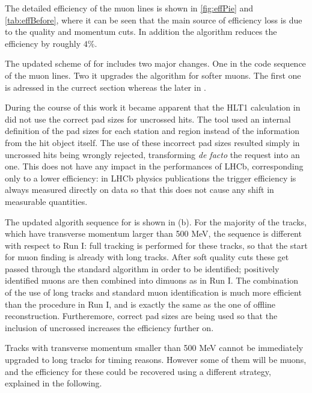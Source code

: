 The detailed efficiency of the \runone \hltone muon lines is shown in \autoref{fig:effPie} and \autoref{tab:effBefore},
where it can be seen that the main source of efficiency loss is due to the quality and momentum cuts.
In addition the \mvm algorithm reduces the efficiency by roughly $4\%$.

The updated scheme of \hltone for \runtwo includes two major changes.
One in the code sequence of the \hltone muon lines. Two it upgrades the \mvm algorithm for softer muons. The first one is adressed
in the currect section whereas the later in .

During the course of this work it became apparent that the HLT1  calculation in \runone
did not use the correct pad sizes for uncrossed hits.
The tool used an internal definition of the pad sizes for each station and
region instead of the information from the hit object itself.
The use of these incorrect pad sizes resulted simply in uncrossed hits being wrongly
rejected, transforming \emph{de facto} the  request into an  one.
This does not have any impact in the performances of LHCb, corresponding only to a lower efficiency:
in LHCb physics publications the trigger efficiency is always measured directly on data so that this
does not cause any shift in measurable quantities.

The updated \hltone algorith sequence for \runtwo is shown in (b).
For the majority of the tracks, which have transverse momentum larger than 500 MeV, the sequence is different with respect to
Run I:
full tracking is performed for these tracks, so that the start for muon finding is already with long tracks.
After soft quality cuts these get passed through the standard  algorithm in order to be identified;
positively identified muons are then combined into dimuons as in Run I.
The combination of the use of long tracks and standard muon identification is much more efficient than the
procedure in Run I, and is exactly the same as the one of offline reconstruction.
Furtheremore, correct pad sizes are being used so that the inclusion of uncrossed increases the efficiency further on.

Tracks with transverse momentum smaller than 500 MeV cannot be immediately upgraded to long tracks for timing reasons.
However some of them will be muons, and the efficiency for these could be recovered using a different strategy,
explained in the following.


